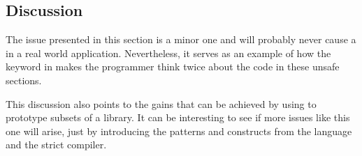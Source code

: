 \subsection{Discussion}

The issue presented in this section is a minor one and will probably never cause a  in a real world application.
Nevertheless, it serves as an example of how the {\unsafe} keyword in {\rust} makes the programmer think twice about the code in these unsafe sections.

This discussion also points to the gains that can be achieved by using {\rust} to prototype subsets of a {\C} library.
It can be interesting to see if more issues like this one will arise, just by introducing the patterns and constructs from the {\rust} language and the strict {\rustc} compiler.

